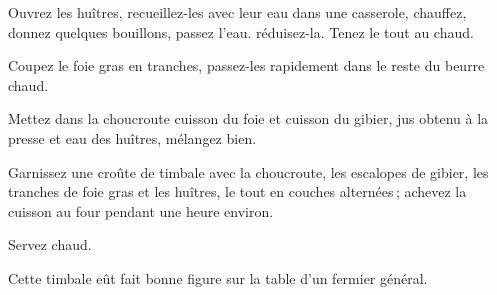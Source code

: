 Ouvrez les huîtres, recueillez-les avec leur eau dans une casserole, chauffez,
donnez quelques bouillons, passez l'eau. réduisez-la. Tenez le tout au chaud.

Coupez le foie gras en tranches, passez-les rapidement dans le reste du beurre
chaud.

Mettez dans la choucroute cuisson du foie et cuisson du gibier, jus obtenu à
la presse et eau des huîtres, mélangez bien.

Garnissez une croûte de timbale avec la choucroute, les escalopes de gibier,
les tranches de foie gras et les huîtres, le tout en couches alternées ;
achevez la cuisson au four pendant une heure environ.

Servez chaud.

Cette timbale eût fait bonne figure sur la table d'un fermier général.
